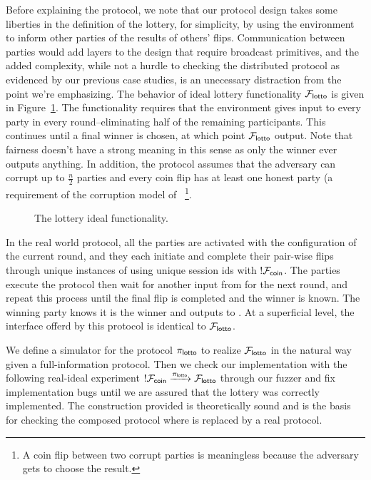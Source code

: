 Before explaining the protocol, we note that our protocol design takes some
liberties in the definition of the lottery, for simplicity, by using the
environment to inform other parties of the results of others' flips.
Communication between parties would add layers to the design that require
broadcast primitives, and the added complexity, while not a hurdle to checking
the distributed protocol as evidenced by our previous case studies, is an
unecessary distraction from the point we're emphasizing.  The behavior of ideal
lottery functionality $\mathcal{F}_{{\mathsf {lotto}}}$ is given in Figure~\ref{fig:flotto}.  The
functionality requires that the environment gives input to every party in every
round--eliminating half of the remaining participants.  This continues until a
final winner is chosen, at which point $\mathcal{F}_{{\mathsf {lotto}}}$ output. Note that
fairness doesn't have a strong meaning in this sense as only the winner ever
outputs anything.  In addition, the protocol assumes that the adversary can
corrupt up to $\frac{n}{2}$ parties and every coin flip has at least one honest
party (a requirement of the corruption model of \Fcoin~\footnote{A coin flip
between two corrupt parties is meaningless because the adversary gets to choose
the result.}.

\begin{figure}
\centering

\caption{The lottery ideal functionality.}
\label{fig:flotto}
\end{figure}

In the real world protocol, all the parties are activated with the
configuration of the current round, and they each initiate and complete their
pair-wise flips through unique instances of \Fcoin using unique session ids
with $!\mathcal{F}_{{\mathsf {coin}}}$.  The parties execute the protocol then wait for another input
from \Z for the next round, and repeat this process until the final flip is
completed and the winner is known.  The winning party knows it is the winner
and outputs to \Z. At a superficial level, the interface offerd by this
protocol is identical to $\mathcal{F}_{{\mathsf {lotto}}}$.

We define a simulator for the protocol $\pi_{{\mathsf {lotto}}}$ to realize
$\mathcal{F}_{{\mathsf {lotto}}}$ in the natural way given a full-information protocol.  Then we
check our implementation with the following real-ideal experiment $!\mathcal{F}_{{\mathsf {coin}}}
\xrightarrow{\pi_{{\mathsf {lotto}}}} \mathcal{F}_{{\mathsf {lotto}}}$ through our fuzzer and fix
implementation bugs until we are assured that the lottery was correctly
implemented. The construction provided is theoretically sound and is the basis
for checking the composed protocol where \Fcoin is replaced by a real protocol. 

